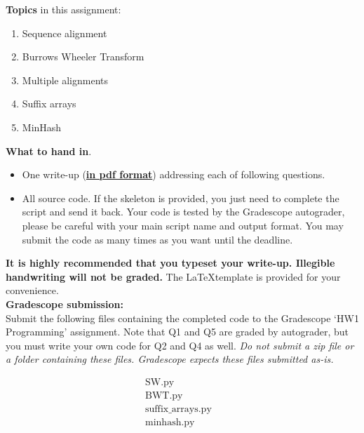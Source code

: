 \noindent 
{\bf Topics} in this assignment: 
\begin{enumerate}
\item Sequence alignment
\item Burrows Wheeler Transform
\item Multiple alignments
\item Suffix arrays
\item MinHash
\end{enumerate}
\vspace{0.2in}


\noindent 
{\bf What to hand in}. 
\begin{itemize}
\item One write-up (\underline{\textbf{in pdf format}}) addressing each of following questions.
\item All source code. If the skeleton is provided, you just need to complete the script and send it back. Your code is tested by the Gradescope autograder, please be careful with your main script name and output format. You may submit the code as many times as you want until the deadline.
\end{itemize}

\textbf{It is highly recommended that you typeset your write-up. Illegible handwriting will not be graded.} The \LaTeX template is provided for your convenience.\\

\noindent\textbf{Gradescope submission:}\\
Submit the following files containing the completed code to the Gradescope `HW1 Programming' assignment. Note that Q1 and Q5 are graded by autograder, but you must write your own code for Q2 and Q4 as well. \textit{Do not submit a zip file or a folder containing these files. Gradescope expects these files submitted as-is.}

\[
  \begin{array}{lllll}
    \text{SW.py}& \\
    \text{BWT.py}& \\ %
    \text{suffix\_arrays.py}& \\ %
    \text{minhash.py}&
  \end{array}
\]
